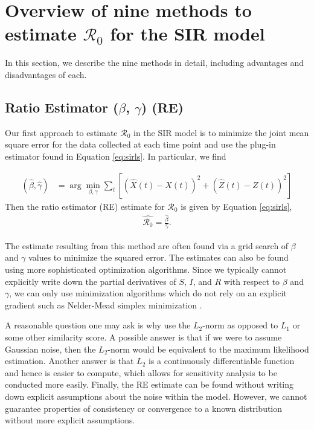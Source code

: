 \documentclass[12pt]{article}
\newcommand{\wxxsir}{nine } %
\newcommand{\rr}{\ensuremath{\mathcal{R}_0}}
\begin{document}
\section{Overview of \wxxsir methods to estimate $\rr$ for the SIR model}
\label{sec:methods} 

In this section, we describe the \wxxsir methods in detail, including advantages and disadvantages of each.

\subsection{Ratio Estimator ($\beta$, $\gamma$) (RE)}\label{least-squares-beta-gamma}
Our first approach to estimate $\rr$ in the SIR model is to minimize the joint mean square error for the data collected at each time point and use the plug-in estimator found in Equation \ref{eq:sirls}.  In particular, we find

\begin{align*}
(\hat{\beta}, \hat{\gamma} )&=\arg \min_{\beta, \gamma} \sum_{t} \left [ \left (\hat{X}(t) - X(t)\right )^2 + \left ( \hat{Z}(t) - Z(t) \right )^2 \right ]
\end{align*}
Then the ratio estimator (RE) estimate for $\rr$ is given by Equation \ref{eq:sirls},
\begin{align}\label{eq:sirls}
  \hat{\rr}= \frac{\hat{\beta}}{\hat{\gamma}}.
\end{align}

The estimate resulting from this method are often found via a grid search of $\beta$ and $\gamma$ values to minimize the squared error.  The estimates can also be found using more sophisticated optimization algorithms. Since we typically cannot explicitly write down the partial derivatives of $S$, $I$, and $R$ with respect to $\beta$ and $\gamma$, we can only use minimization algorithms which do not rely on an explicit gradient such as Nelder-Mead simplex minimization \citep{nelder-mead1965}.

A reasonable question one may ask is why use the $L_2$-norm as opposed to $L_1$ or some other similarity score.  A possible answer is that if we were to assume Gaussian noise, then the $L_2$-norm would be equivalent to the maximum likelihood estimation.  Another answer is that $L_2$ is a continuously differentiable function and hence is easier to compute, which allows for sensitivity analysis to  be conducted more easily.  Finally, the RE estimate can be found without writing down explicit assumptions about the noise within the model.  However, we cannot guarantee properties of consistency or convergence to a known distribution without more explicit assumptions.  
\end{document}
